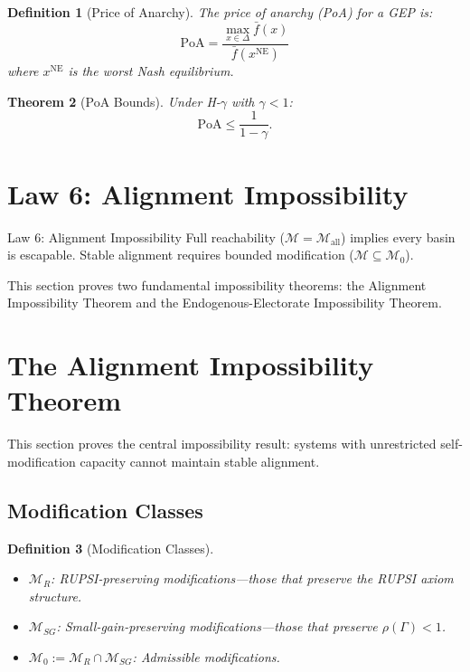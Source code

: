 \documentclass[12pt]{article}
\newtheorem{theorem}{Theorem}[section]
\newtheorem{definition}[theorem]{Definition}
\begin{document}
\begin{definition}[Price of Anarchy]
The \emph{price of anarchy} (PoA) for a GEP is:
\[
\text{PoA} = \frac{\max_{x \in \Delta} \bar{f}(x)}{\bar{f}(x^{\text{NE}})}
\]
where $x^{\text{NE}}$ is the worst Nash equilibrium.
\end{definition}

\begin{theorem}[PoA Bounds]
Under H-$\gamma$ with $\gamma < 1$:
\[
\text{PoA} \leq \frac{1}{1 - \gamma}.
\]
\end{theorem}



\section{Law 6: Alignment Impossibility}
\label{sec:law6}

\begin{lawbox}{Law 6: Alignment Impossibility}
Full reachability ($\mathcal{M} = \mathcal{M}_{\text{all}}$) implies every basin is escapable. Stable alignment requires bounded modification ($\mathcal{M} \subseteq \mathcal{M}_0$).
\end{lawbox}

This section proves two fundamental impossibility theorems: the Alignment Impossibility Theorem and the Endogenous-Electorate Impossibility Theorem.

\section{The Alignment Impossibility Theorem}
\label{sec:alignment-impossibility}

This section proves the central impossibility result: systems with unrestricted self-modification capacity cannot maintain stable alignment.

\subsection{Modification Classes}

\begin{definition}[Modification Classes]
\begin{itemize}
    \item $\mathcal{M}_R$: \emph{RUPSI-preserving} modifications---those that preserve the RUPSI axiom structure.
    \item $\mathcal{M}_{SG}$: \emph{Small-gain-preserving} modifications---those that preserve $\rho(\Gamma) < 1$.
    \item $\mathcal{M}_0 := \mathcal{M}_R \cap \mathcal{M}_{SG}$: \emph{Admissible} modifications.
\end{itemize}
\end{definition}
\end{document}
